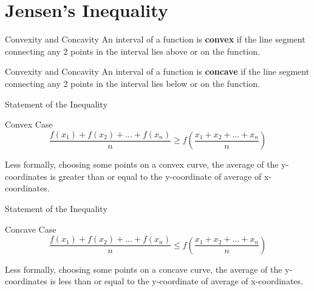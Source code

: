 \section{Jensen's Inequality}
\begin{namedframe}{Convexity and Concavity}
	An interval of a function is \textbf{convex} if the line segment connecting any 2 points in the interval lies above or on the function.
	\begin{center}\end{center}
\end{namedframe}

\begin{namedframe}{Convexity and Concavity}
	An interval of a function is \textbf{concave} if the line segment connecting any 2 points in the interval lies below or on the function.
	\begin{center}\end{center}
\end{namedframe}

\begin{namedframe}{Statement of the Inequality}
	\begin{block}{Convex Case}
		\[\frac{f(x_1) + f(x_2) + ... + f(x_n)}{n} \geq f \left( \frac{x_1 + x_2 + ... + x_n}{n} \right ) \]
	\end{block}

	Less formally, choosing some points on a convex curve, the average of the y-coordinates is greater than or equal to the
	y-coordinate of average of x-coordinates.
\end{namedframe}

\begin{namedframe}{Statement of the Inequality}
	\begin{block}{Concave Case}
		\[\frac{f(x_1) + f(x_2) + ... + f(x_n)}{n} \leq f \left( \frac{x_1 + x_2 + ... + x_n}{n} \right ) \]
	\end{block}

	Less formally, choosing some points on a concave curve, the average of the y-coordinates is less than or equal to the
	y-coordinate of average of x-coordinates.
\end{namedframe}

